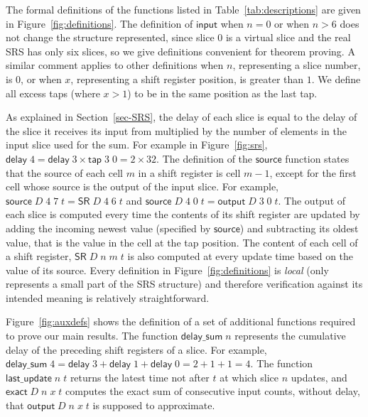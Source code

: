 \documentclass{llncs}
\begin{document}
The formal definitions of the functions listed in Table~\ref{tab:descriptions} are given in Figure~\ref{fig:definitions}.
The definition of $\mathsf{input}$ when $n=0$ or when $n>6$ does not change the structure represented, since slice $0$ is a virtual slice and the real SRS has only six slices, so we give definitions convenient for theorem proving.
A similar comment applies to other definitions when $n$, representing a slice number, is $0$, or when $x$, representing a shift register position, is greater than $1$.
We define all excess taps (where $x > 1$) to be in the same position as the last tap.

As explained in Section~\ref{sec-SRS}, the delay of each slice is equal to the delay of the slice it receives its input from multiplied by the number of elements in the input slice used for the sum.
For example in Figure~\ref{fig:srs}, $\mathsf{delay}\;4 = \mathsf{delay}\;3 \times \mathsf{tap}\;3\;0 = 2 \times 32$.
The definition of the $\mathsf{source}$ function states that the source of each cell $m$ in a shift register is cell $m-1$, except for the first cell whose source is the output of the input slice.
For example, $\mathsf{source}\;D\;4\;7\;t = \mathsf{SR}\;D\;4\;6\;t$ and $\mathsf{source}\;D\;4\;0\;t = \mathsf{output}\;D\;3\;0\;t$.
The output of each slice is computed every time the contents of its shift register are updated by adding the incoming newest value (specified by $\mathsf{source}$) and subtracting its oldest value, that is the value in the cell at the tap position.
The content of each cell of a shift register, $\mathsf{SR}\;D\;n\;m\;t$  is also computed at every update time based on the value of its source.
Every definition in Figure~\ref{fig:definitions} is \emph{local} (only represents a small part of the SRS structure) and therefore verification against its intended meaning is relatively straightforward.

Figure~\ref{fig:auxdefs} shows the definition of a set of additional functions required to prove our main results.
The function $\mathsf{delay\_sum}\;n$ represents the cumulative delay of the preceding shift registers of a slice.
For example, $\mathsf{delay\_sum}\;4 = \mathsf{delay}\;3 + \mathsf{delay}\;1 + \mathsf{delay}\;0 = 2 +1 +1 = 4$.
The function $\mathsf{last\_update}\;n\;t$ returns the latest time not after $t$ at which slice $n$ updates, and $\mathsf{exact}\;D\;n\;x\;t$ computes the exact sum of consecutive input counts, without delay, that $\mathsf{output}\;D\;n\;x\;t$ is supposed to approximate.
\end{document}
